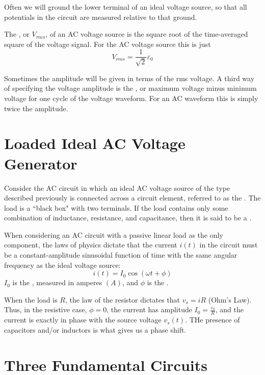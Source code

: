 \documentclass[12pt, a4paper, oneside, openright, titlepage]{book}
\begin{document}
Often we will ground the lower terminal of an ideal voltage source, so that all potentials in the circuit are measured relative to that ground. 

\begin{defn}
    The , or $V_{rms}$, of an AC voltage source is the square root of the time-averaged square of the voltage signal. For the AC voltage source this is just $$V_{rms} = \frac{1}{\sqrt{2}}\varepsilon_0$$
\end{defn}

Sometimes the amplitude will be given in terms of the rms voltage. A third way of specifying the voltage amplitude is the , or maximum voltage minus minimum voltage for one cycle of the voltage waveform. For an AC waveform this is simply twice the amplitude.

\section{Loaded Ideal AC Voltage Generator}

Consider the AC circuit in which an ideal AC voltage source of the type described previously is connected across a circuit element, referred to as the . The load is a ``black box" with two terminals. If the load contains only some combination of inductance, resistance, and capacitance, then it is said to be a .

\begin{prop}
    When considering an AC circuit with a passive linear load as the only component, the laws of physics dictate that the current $i(t)$ in the circuit must be a constant-amplitude sinusoidal function of time with the same angular frequency as the ideal voltage source: $$i(t) = I_0\cos(\omega t+\phi)$$
    $I_0$ is the , measured in amperes $(A)$, and $\phi$ is the .
\end{prop}

When the load is  $R$, the law of the resistor dictates that $v_s = iR$ (Ohm's Law). Thus, in the resistive case, $\phi = 0$, the current has amplitude $I_0 = \frac{\varepsilon_0}{R}$, and the current is exactly in phase with the source voltage $v_s(t)$. THe presence of capacitors and/or inductors is what gives us a phase shift.

\section{Three Fundamental Circuits}
\end{document}
